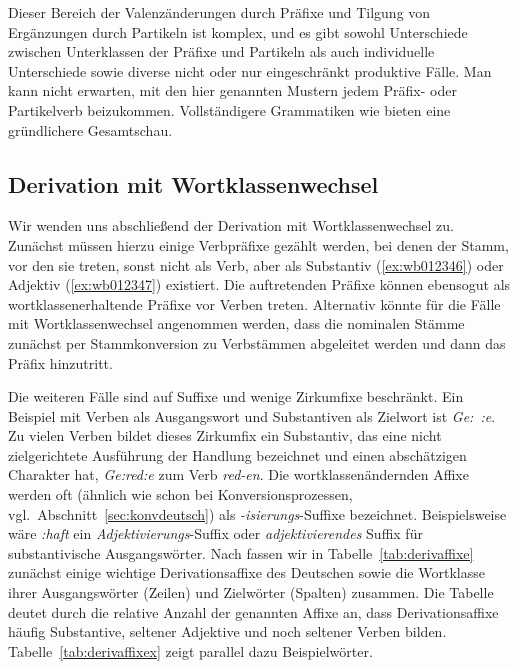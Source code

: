 Dieser Bereich der Valenzänderungen durch Präfixe und Tilgung von Ergänzungen durch Partikeln ist komplex, und es gibt sowohl Unterschiede zwischen Unterklassen der Präfixe und Partikeln als auch individuelle Unterschiede sowie diverse nicht oder nur eingeschränkt produktive Fälle.
Man kann nicht erwarten, mit den hier genannten Mustern jedem Präfix- oder Partikelverb beizukommen.
Vollständigere Grammatiken wie \citet{Eisenberg1} bieten eine gründlichere Gesamtschau.

\subsection{Derivation mit Wortklassenwechsel}


Wir wenden uns abschließend der Derivation mit Wortklassenwechsel zu.
Zunächst müssen hierzu einige Verbpräfixe gezählt werden, bei denen der Stamm, vor den sie treten, sonst nicht als Verb, aber als Substantiv (\ref{ex:wb012346}) oder Adjektiv (\ref{ex:wb012347}) existiert.
Die auftretenden Präfixe können \idR ebensogut als wortklassenerhaltende Präfixe vor Verben treten.
Alternativ könnte für die Fälle mit Wortklassenwechsel angenommen werden, dass die nominalen Stämme zunächst per Stammkonversion zu Verbstämmen abgeleitet werden und dann das Präfix hinzutritt.

\begin{exe}
  \ex\label{ex:wb012346}
  \begin{xlist}
  \end{xlist}
  \ex\label{ex:wb012347}
  \begin{xlist}
  \end{xlist}
\end{exe}

Die weiteren Fälle sind auf Suffixe und wenige Zirkumfixe beschränkt.
Ein Beispiel mit Verben als Ausgangswort und Substantiven als Zielwort ist \textit{Ge:~:e}.
Zu vielen Verben bildet dieses Zirkumfix ein Substantiv, das eine nicht zielgerichtete Ausführung der Handlung bezeichnet und einen abschätzigen Charakter hat, \zB \textit{Ge:red:e} zum Verb \textit{red-en}.
Die wortklassenändernden Affixe werden oft (ähnlich wie schon bei Konversionsprozessen, vgl.\ Abschnitt~\ref{sec:konvdeutsch}) als \textit{-isierungs}-Suffixe bezeichnet.
Beispielsweise wäre \textit{:haft} ein \textit{Adjektivierungs}-Suffix oder \textit{adjektivierendes} Suffix für substantivische Ausgangswörter.
Nach \citet[267]{Eisenberg1} fassen wir in Tabelle~\ref{tab:derivaffixe} zunächst einige wichtige Derivationsaffixe des Deutschen sowie die Wortklasse ihrer Ausgangswörter (Zeilen) und Zielwörter (Spalten) zusammen.
Die Tabelle deutet durch die relative Anzahl der genannten Affixe an, dass Derivationsaffixe häufig Substantive, seltener Adjektive und noch seltener Verben bilden.
Tabelle~\ref{tab:derivaffixex} zeigt parallel dazu Beispielwörter.

